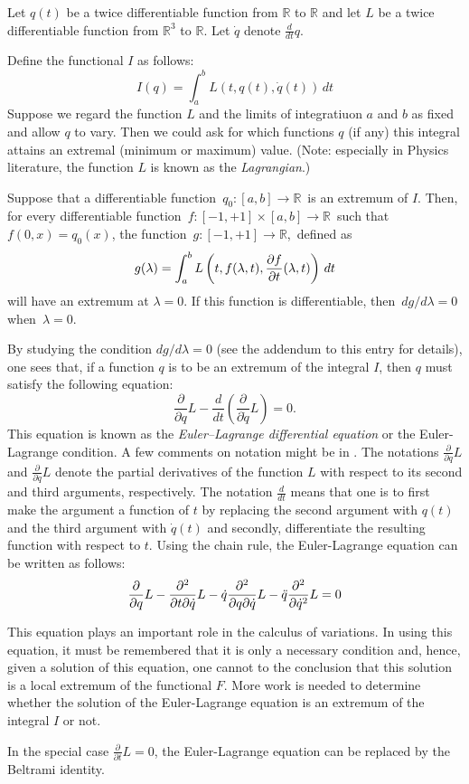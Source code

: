 \documentclass{article}
\newcommand{\md}{d}
\newcommand{\mderiv}[1]{\frac{\md}{\md {#1}}} %
\newcommand{\mpderiv}[1]{\frac{\partial}{\partial {#1}}} %
\newcommand{\reals}{\mathbb{R}}
\begin{document}
Let $q(t)$ be a twice differentiable function from $\reals$ to $\reals$ and let $L$ be a twice differentiable function from $\reals^3$ to $\reals$.  Let
$\dot{q}$ denote $\mderiv{t}{q}$.

Define the functional $I$ as follows:
 $$I(q) = \int_a^b L (t, q(t), \dot{q}(t)) \, dt$$
Suppose we regard the function $L$ and the limits of integratiuon $a$ and $b$
as fixed and allow $q$ to vary.  Then we could ask for which functions $q$ (if any) this integral attains an extremal (minimum or maximum) value.  (Note: especially in Physics literature, the function $L$ is known as the \emph{Lagrangian}.)

Suppose that a differentiable function \,$q_0\!: [a,b] \to \reals$\, is an extremum of $I$.  Then, for every differentiable function \,$f \colon [-1,+1] \times [a,b] \to \reals$\, such that\, $f(0,x) = q_0 (x)$, the function 
\,$g \colon [-1, +1] \to \reals$,\, defined as
 $$g (\lambda) = \int_a^b L \left( t, f(\lambda, t), {\partial f \over \partial t} (\lambda, t) \right) \, dt$$
will have an extremum at $\lambda = 0$.  If this function is differentiable, then\, $dg/d\lambda = 0$\, when \,$\lambda = 0$. 

By studying the condition $dg/d\lambda = 0$ (see the addendum to this entry for details), one sees that, if a function $q$ is to be an extremum of the integral $I$, then $q$ must satisfy the following equation:
\begin{equation}
\mpderiv{q} L - \mderiv{t} \left( \mpderiv{\dot{q}} L \right) = 0.
\end{equation}
This equation is known as the \emph{Euler--Lagrange differential equation} or  the Euler-Lagrange condition.  A few comments on notation might be in .  The notations $\mpderiv{q} L$ and $\mpderiv{\dot{q}} L$ denote the partial derivatives of the function $L$ with respect to its second and third arguments, respectively.  The notation $\mderiv{t}$ means that one is to first make the argument a function of $t$ by replacing the second argument with $q(t)$ and the third argument with $\dot{q}(t)$ and secondly, differentiate the resulting function with respect to $t$.  Using the chain rule, the Euler-Lagrange equation can be written as follows:
\begin{equation}
\mpderiv{q} L - {\partial^2 \over \partial t \partial \dot{q}} L - \dot{q} {\partial^2 \over \partial q \partial \dot{q}} L - \ddot{q} {\partial^2 \over  \partial \dot{q}^2} L = 0
\end{equation}

This equation plays an important role in the calculus of variations.  In using this equation, it must be remembered that it is only a necessary condition and, hence, given a solution of this equation, one cannot  to the conclusion that this solution is a local extremum of the functional $F$.  More work is needed to determine whether the solution of the Euler-Lagrange equation is an extremum of the integral $I$ or not.

In the special case $\mpderiv{t} L = 0$, the Euler-Lagrange equation can be replaced by the Beltrami identity.
\end{document}
